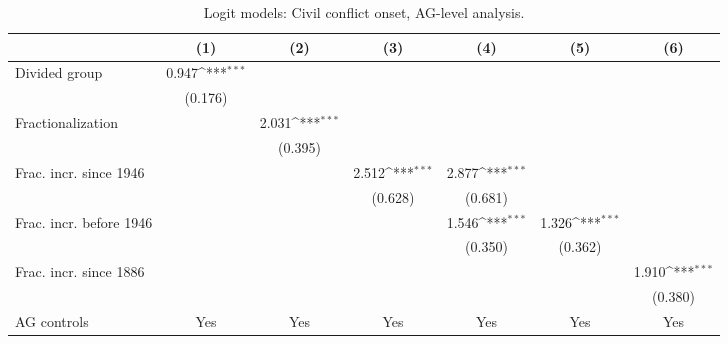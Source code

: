 \begin{table}[htbp]\centering
\def\sym#1{\ifmmode^{#1}\else\(^{#1}\)\fi}
\caption{Logit models: Civil conflict onset, AG-level analysis. \label{tab:rob:ag1}}
\begin{tabular}{l*{6}{c}}
\hline\hline
                    &\multicolumn{1}{c}{(1)}         &\multicolumn{1}{c}{(2)}         &\multicolumn{1}{c}{(3)}         &\multicolumn{1}{c}{(4)}         &\multicolumn{1}{c}{(5)}         &\multicolumn{1}{c}{(6)}         \\
\hline
Divided group       &       0.947\sym{***}&                     &                     &                     &                     &                     \\
                    &     (0.176)         &                     &                     &                     &                     &                     \\
Fractionalization   &                     &       2.031\sym{***}&                     &                     &                     &                     \\
                    &                     &     (0.395)         &                     &                     &                     &                     \\
Frac. incr. since 1946&                     &                     &       2.512\sym{***}&       2.877\sym{***}&                     &                     \\
                    &                     &                     &     (0.628)         &     (0.681)         &                     &                     \\
Frac. incr. before 1946&                     &                     &                     &       1.546\sym{***}&       1.326\sym{***}&                     \\
                    &                     &                     &                     &     (0.350)         &     (0.362)         &                     \\
Frac. incr. since 1886&                     &                     &                     &                     &                     &       1.910\sym{***}\\
                    &                     &                     &                     &                     &                     &     (0.380)         \\
\hline
AG controls         &         Yes         &         Yes         &         Yes         &         Yes         &         Yes         &         Yes         \\

\end{tabular}
\end{table}
